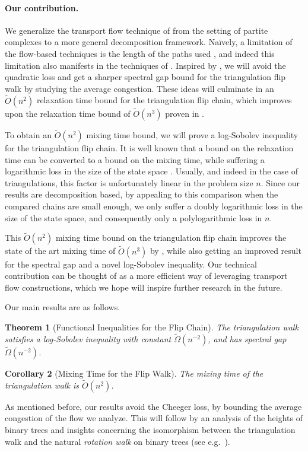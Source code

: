 \documentclass[a4paper, 12p]{article}
\numberwithin{equation}{section}
\newtheorem{theorem}{Theorem}[section]
\newtheorem{corollary}[theorem]{Corollary}
\begin{document}
\paragraph{Our contribution.}
We generalize the transport flow technique of \cite{weimingjs} from the setting of partite complexes to a more general decomposition framework. Na\"ively, a limitation of the flow-based techniques is the length of the paths used \cite{diacstroock}, and indeed this limitation also manifests in the techniques of \cite{weimingjs}. Inspired by \cite{montenegrovc}, we will avoid the quadratic loss and get a sharper spectral gap bound for the triangulation flip walk by studying the average congestion. These ideas will culminate in an $\widetilde O(n^2)$ relaxation time bound for the triangulation flip chain, which improves upon the relaxation time bound of $\widetilde O(n^3)$ proven in \cite{eppstein2022improved}.

To obtain an $\widetilde O(n^2)$ mixing time bound, we will prove a log-Sobolev inequality for the triangulation flip chain.  It is well known that a bound on the relaxation time can be converted to a bound on the mixing time, while suffering a logarithmic loss in the size of the state space \cite{diaconis1996logarithmic}. Usually, and indeed in the case of triangulations, this factor is unfortunately linear in the problem size $n$. Since our results are decomposition based, by appealing to this comparison when the compared chains are small enough, we only suffer a doubly logarithmic loss in the size of the state space, and consequently only a polylogarithmic loss in $n$.

This $\widetilde O(n^{2})$ mixing time bound on the triangulation flip chain improves the state of the art mixing time of $\widetilde O(n^3)$ by \cite{eppstein2022improved}, while also getting an improved result for the spectral gap and a novel log-Sobolev inequality. Our technical contribution can be thought of as a more efficient way of leveraging transport flow constructions, which we hope will inspire further research in the future.

Our main results are as follows.
\begin{theorem}[Functional Inequalities for the Flip Chain]
    \label{thm:lsi}
    The triangulation walk satisfies a log-Sobolev inequality with constant $\widetilde{\Omega}(n^{-2})$, and has spectral gap $\widetilde\Omega( n^{-2})$.
\end{theorem}

\begin{corollary}[Mixing Time for the Flip Walk]
    \label{cor:mix_flip}
    The mixing time of the triangulation walk is $\widetilde{O}(n^{2})$.
\end{corollary}
As mentioned before, our results avoid the Cheeger loss, by bounding the average congestion of the flow we analyze. This will follow by an analysis of the heights of binary trees and insights concerning the isomorphism between the triangulation walk and the natural \emph{rotation walk} on binary trees (see e.g.~\cite{sleator1988rotation,hiltonpedersen,cohenthesis}). 
\end{document}
